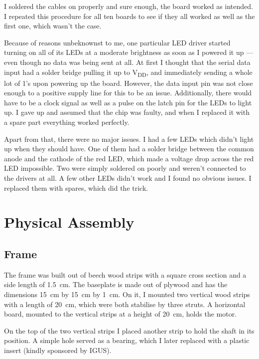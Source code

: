 \documentclass[a4paper, 11pt, titlepage]{report}
\def \vdd {V\textsubscript{DD}}
\begin{document}
I soldered the cables on properly and sure enough, the board worked as intended. I repeated this
procedure for all ten boards to see if they all worked as well as the first one, which wasn't the
case.

Because of reasons unbeknownst to me, one particular LED driver started turning on all of its LEDs
at a moderate brightness as soon as I powered it up --- even though no data was being sent at all.
At first I thought that the serial data input had a solder bridge pulling it up to \vdd, and
immediately sending a whole lot of 1's upon powering up the board. However, the data input pin was
not close enough to a positive supply line for this to be an issue. Additionally, there would have
to be a clock signal as well as a pulse on the latch pin for the LEDs to light up. I gave up and
assumed that the chip was faulty, and when I replaced it with a spare part everything worked
perfectly.

Apart from that, there were no major issues. I had a few LEDs which didn't light up when they
should have. One of them had a solder bridge between the common anode and the cathode of the red
LED, which made a voltage drop across the red LED impossible. Two were simply soldered on poorly
and weren't connected to the drivers at all. A few other LEDs didn't work and I found no obvious
issues. I replaced them with spares, which did the trick.


\section{Physical Assembly}


\subsection{Frame}

The frame was built out of beech wood strips with a square cross section and a side length of
\SI{1.5}{\centi\meter}. The baseplate is made out of plywood and has the dimensions
\SI{15}{\centi\meter} by \SI{15}{\centi\meter} by \SI{1}{\centi\meter}. On it, I mounted two
vertical wood strips with a length of \SI{20}{\centi\meter}, which were both stabilise by three
struts. A horizontal board, mounted to the vertical strips at a height of \SI{20}{\centi\meter},
holds the motor.

On the top of the two vertical strips I placed another strip to hold the shaft in its position.
A simple hole served as a bearing, which I later replaced with a plastic insert (kindly sponsored
by IGUS).
\end{document}
